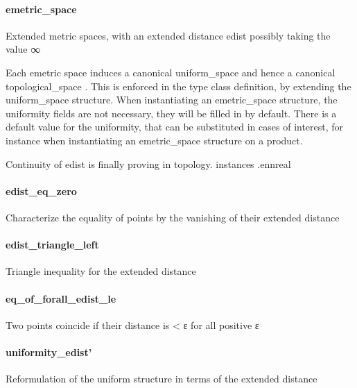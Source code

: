 \documentclass{article}
\begin{document}
\paragraph{emetric\_space}
\par
Extended metric spaces, with an extended distance 
\colorbox[RGB]{253,246,227}{{{{\color[RGB]{101, 123, 131} edist }}}} possibly taking the
value ∞
\par
Each emetric space induces a canonical 
\colorbox[RGB]{253,246,227}{{{{\color[RGB]{101, 123, 131} uniform\_space }}}} and hence a canonical 
\colorbox[RGB]{253,246,227}{{{{\color[RGB]{101, 123, 131} topological\_space }}}}.
This is enforced in the type class definition, by extending the 
\colorbox[RGB]{253,246,227}{{{{\color[RGB]{101, 123, 131} uniform\_space }}}} structure. When
instantiating an 
\colorbox[RGB]{253,246,227}{{{{\color[RGB]{101, 123, 131} emetric\_space }}}} structure, the uniformity fields are not necessary, they will be
filled in by default. There is a default value for the uniformity, that can be substituted
in cases of interest, for instance when instantiating an 
\colorbox[RGB]{253,246,227}{{{{\color[RGB]{101, 123, 131} emetric\_space }}}} structure
on a product.
\par
Continuity of 
\colorbox[RGB]{253,246,227}{{{{\color[RGB]{101, 123, 131} edist }}}} is finally proving in 
\colorbox[RGB]{253,246,227}{{{{\color[RGB]{101, 123, 131} topology. }}}{{{\color[RGB]{133, 153, 0} instances }}}{{{\color[RGB]{101, 123, 131} .ennreal }}}}\paragraph{edist\_eq\_zero}
\par
Characterize the equality of points by the vanishing of their extended distance
\paragraph{edist\_triangle\_left}
\par
Triangle inequality for the extended distance
\paragraph{eq\_of\_forall\_edist\_le}
\par
Two points coincide if their distance is 
\colorbox[RGB]{253,246,227}{{{{\color[RGB]{181, 137, 0} < }}}{{{\color[RGB]{101, 123, 131}  ε }}}} for all positive ε
\paragraph{uniformity\_edist'}
\par
Reformulation of the uniform structure in terms of the extended distance
\end{document}
